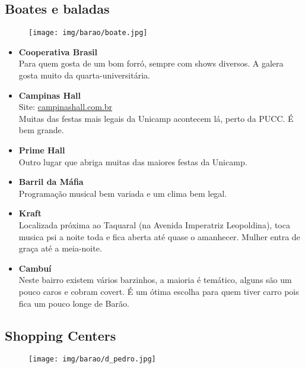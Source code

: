 \subsection{Boates e baladas}

\begin{figure}[h!]
  \centering
  \texttt{[image: img/barao/boate.jpg]}
\end{figure}

\begin{itemize}
\item \textbf{Cooperativa Brasil}
  \\Para quem gosta de um bom forró, sempre com shows diversos. A galera gosta
  muito da quarta-universitária.

\item \textbf{Campinas Hall}
  \\Site: \url{campinashall.com.br}
  \\Muitas das festas mais legais da Unicamp acontecem lá, perto da PUCC. É bem
  grande.

\item \textbf{Prime Hall}
  \\Outro lugar que abriga muitas das maiores festas da Unicamp.

\item \textbf{Barril da Máfia}
  \\Programação musical bem variada e um clima bem legal.

\item \textbf{Kraft}
  \\Localizada próxima ao Taquaral (na Avenida Imperatriz Leopoldina), toca
  musica psi a noite toda e fica aberta até quase o amanhecer. Mulher entra de
  graça até a meia-noite.

\item \textbf{Cambuí}
  \\Neste bairro existem vários barzinhos, a maioria é temático, alguns são um
  pouco caros e cobram covert. É um ótima escolha para quem tiver carro pois
  fica um pouco longe de Barão.
\end{itemize}

\subsection{Shopping Centers}

\begin{figure}[h!]
  \centering
  \texttt{[image: img/barao/d\_pedro.jpg]}
\end{figure}

